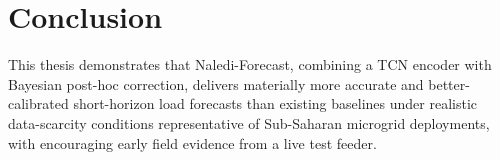 \section{Conclusion}
This thesis demonstrates that Naledi-Forecast, combining a TCN encoder with Bayesian
post-hoc correction, delivers materially more accurate and better-calibrated short-horizon
load forecasts than existing baselines under realistic data-scarcity conditions
representative of Sub-Saharan microgrid deployments, with encouraging early field evidence
from a live test feeder.

\appendix
